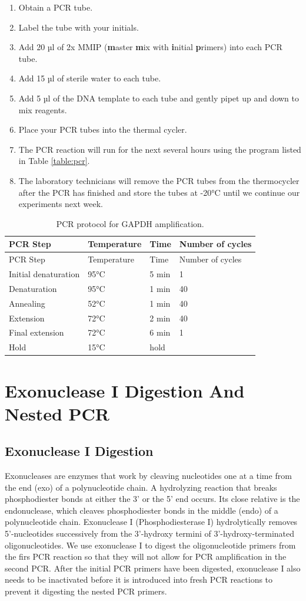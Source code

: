 \documentclass[]{book}
\providecommand{\tightlist}{%
  \setlength{\itemsep}{0pt}\setlength{\parskip}{0pt}}
\theoremstyle{definition}
\theoremstyle{definition}
\theoremstyle{definition}
\theoremstyle{remark}
\begin{document}
\begin{enumerate}
\def\labelenumi{\arabic{enumi}.}
\tightlist
\item
  Obtain a PCR tube.
\item
  Label the tube with your initials.
\item
  Add 20 µl of 2x MMIP (\textbf{m}aster \textbf{m}ix with
  \textbf{i}nitial \textbf{p}rimers) into each PCR tube.
\item
  Add 15 µl of sterile water to each tube.
\item
  Add 5 µl of the DNA template to each tube and gently pipet up and down
  to mix reagents.
\item
  Place your PCR tubes into the thermal cycler.
\item
  The PCR reaction will run for the next several hours using the program
  listed in Table \ref{table:pcr}.
\item
  The laboratory technicians will remove the PCR tubes from the
  thermocycler after the PCR has finished and store the tubes at -20°C
  until we continue our experiments next week.
\end{enumerate}

\begin{longtable}[]{@{}llll@{}}
\caption{\label{tab:pcr} PCR protocol for GAPDH
amplification.}\tabularnewline
\toprule
PCR Step & Temperature & Time & Number of cycles\tabularnewline
\midrule
\endfirsthead
\toprule
PCR Step & Temperature & Time & Number of cycles\tabularnewline
\midrule
\endhead
Initial denaturation & 95°C & 5 min & 1\tabularnewline
Denaturation & 95°C & 1 min & 40\tabularnewline
Annealing & 52°C & 1 min & 40\tabularnewline
Extension & 72°C & 2 min & 40\tabularnewline
Final extension & 72°C & 6 min & 1\tabularnewline
Hold & 15°C & hold &\tabularnewline
\bottomrule
\end{longtable}

\chapter{Exonuclease I Digestion And Nested
PCR}\label{exonuclease-i-digestion-and-nested-pcr}

\section{Exonuclease I Digestion}\label{exonuclease-i-digestion}

Exonucleases are enzymes that work by cleaving nucleotides one at a time
from the end (exo) of a polynucleotide chain. A hydrolyzing reaction
that breaks phosphodiester bonds at either the 3' or the 5' end occurs.
Its close relative is the endonuclease, which cleaves phosphodiester
bonds in the middle (endo) of a polynucleotide chain. Exonuclease I
(Phosphodiesterase I) hydrolytically removes 5'-nucleotides successively
from the 3'-hydroxy termini of 3'-hydroxy-terminated oligonucleotides.
We use exonuclease I to digest the oligonucleotide primers from the firs
PCR reaction so that they will not allow for PCR amplification in the
second PCR. After the initial PCR primers have been digested,
exonuclease I also needs to be inactivated before it is introduced into
fresh PCR reactions to prevent it digesting the nested PCR primers.
\end{document}
